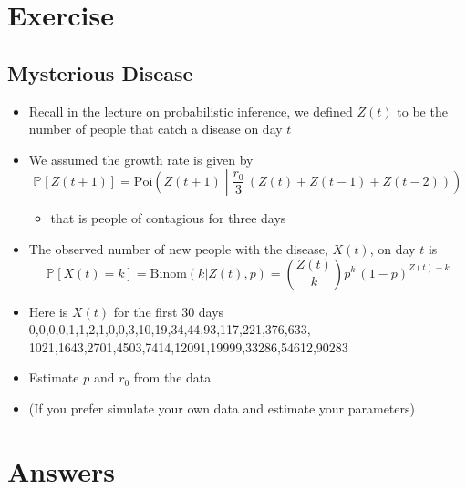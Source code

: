 \documentclass[11pt]{article}
\newcommand{\Prob}[2][]{\mathbb{P}_{#1\!}\left[ #2 \right]}
\begin{document}
\section{Exercise}
\label{sec:org5b04c10}

\subsection{Mysterious Disease}
\label{sec:orgc9f4a4c}
\begin{itemize}
\item Recall in the lecture on probabilistic inference, we defined \(Z(t)\)
to be the number of people that catch a disease on day \(t\)
\item We assumed the growth rate is given by
$$ \Prob{Z(t+1)} = \mathrm{Poi}\!\left(Z(t+1)\middle|
     \frac{r_0}{3}\, (Z(t)+Z(t-1)+Z(t-2)) \right) $$
\begin{itemize}
\item that is people of contagious for three days
\end{itemize}
\item The observed number of new people with the disease, \(X(t)\), on
day \(t\) is 
$$ \Prob{X(t) = k} = \mathrm{Binom}(k|Z(t), p) = \binom{Z(t)}{k}
     p^k\,(1-p)^{Z(t)-k} $$
\item Here is \(X(t)\) for the first 30 days\\
0,0,0,0,1,1,2,1,0,0,3,10,19,34,44,93,117,221,376,633,\\
1021,1643,2701,4503,7414,12091,19999,33286,54612,90283\\
\item Estimate \(p\) and \(r_{0}\) from the data
\item (If you prefer simulate your own data and estimate your parameters)
\end{itemize}

\section{Answers}
\label{sec:org884fc13}
\end{document}
